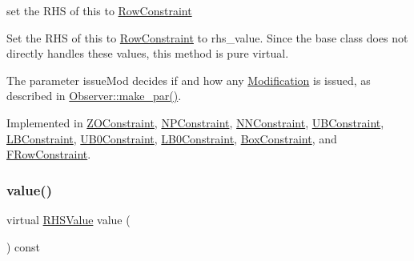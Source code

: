 set the R\+HS of this to \mbox{\hyperlink{class_s_m_spp__di__unipi__it_1_1_row_constraint}{Row\+Constraint}} 

Set the R\+HS of this to \mbox{\hyperlink{class_s_m_spp__di__unipi__it_1_1_row_constraint}{Row\+Constraint}} to rhs\+\_\+value. Since the base class does not directly handles these values, this method is pure virtual.

The parameter issue\+Mod decides if and how any \mbox{\hyperlink{class_s_m_spp__di__unipi__it_1_1_modification}{Modification}} is issued, as described in \mbox{\hyperlink{class_s_m_spp__di__unipi__it_1_1_observer_a2d499ae38e5e95cf66cd71da32b0694a}{Observer\+::make\+\_\+par()}}. 

Implemented in \mbox{\hyperlink{class_s_m_spp__di__unipi__it_1_1_z_o_constraint_a921fe527a5e01a2f6568c3d5d233380a}{Z\+O\+Constraint}}, \mbox{\hyperlink{class_s_m_spp__di__unipi__it_1_1_n_p_constraint_aaa68803a805a1bdf232c50aa56bb0807}{N\+P\+Constraint}}, \mbox{\hyperlink{class_s_m_spp__di__unipi__it_1_1_n_n_constraint_aaa68803a805a1bdf232c50aa56bb0807}{N\+N\+Constraint}}, \mbox{\hyperlink{class_s_m_spp__di__unipi__it_1_1_u_b_constraint_aaa68803a805a1bdf232c50aa56bb0807}{U\+B\+Constraint}}, \mbox{\hyperlink{class_s_m_spp__di__unipi__it_1_1_l_b_constraint_a921fe527a5e01a2f6568c3d5d233380a}{L\+B\+Constraint}}, \mbox{\hyperlink{class_s_m_spp__di__unipi__it_1_1_u_b0_constraint_aaa68803a805a1bdf232c50aa56bb0807}{U\+B0\+Constraint}}, \mbox{\hyperlink{class_s_m_spp__di__unipi__it_1_1_l_b0_constraint_aaa68803a805a1bdf232c50aa56bb0807}{L\+B0\+Constraint}}, \mbox{\hyperlink{class_s_m_spp__di__unipi__it_1_1_box_constraint_a921fe527a5e01a2f6568c3d5d233380a}{Box\+Constraint}}, and \mbox{\hyperlink{class_s_m_spp__di__unipi__it_1_1_f_row_constraint_a921fe527a5e01a2f6568c3d5d233380a}{F\+Row\+Constraint}}.

\mbox{\label{class_s_m_spp__di__unipi__it_1_1_row_constraint_a42562ba0a608bdc52a80a2bb512d0603}} 
\subsubsection{\texorpdfstring{value()}{value()}}
{\footnotesize\ttfamily virtual \mbox{\hyperlink{class_s_m_spp__di__unipi__it_1_1_row_constraint_a8813536ab3b13a81c8e83a999ade3bd8}{R\+H\+S\+Value}} value (\begin{DoxyParamCaption}\item[{void}]{ }\end{DoxyParamCaption}) const\hspace{0.3cm}{\ttfamily [pure virtual]}}



